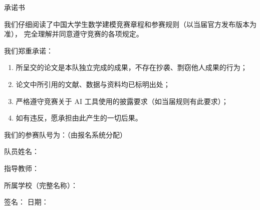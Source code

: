 \documentclass[12pt,a4paper]{ctexart}
\begin{document}
\thispagestyle{empty}

\begin{center}
    {\heiti 承\quad 诺\quad 书}
\end{center}
\vspace{1.5em}

我们仔细阅读了中国大学生数学建模竞赛章程和参赛规则（以当届官方发布版本为准），
完全理解并同意遵守竞赛的各项规定。

我们郑重承诺：
\begin{enumerate}
    \item 所呈交的论文是本队独立完成的成果，不存在抄袭、剽窃他人成果的行为；
    \item 论文中所引用的文献、数据与资料均已标明出处；
    \item 严格遵守竞赛关于 AI 工具使用的披露要求（如当届规则有此要求）；
    \item 如有违反，愿承担由此产生的一切后果。
\end{enumerate}

\vspace{2em}
\noindent 我们的参赛队号为：\underline{\hspace{6em}}（由报名系统分配）

\vspace{1em}
\noindent 队员姓名：\underline{\hspace{8em}}\quad
\underline{\hspace{8em}}\quad \underline{\hspace{8em}}

\vspace{1em}
\noindent 指导教师：\underline{\hspace{8em}}

\vspace{1em}
\noindent 所属学校（完整名称）：\underline{\hspace{24em}}

\vspace{1em}
\noindent 签名：\underline{\hspace{6em}}\quad
\underline{\hspace{6em}}\quad \underline{\hspace{6em}}\qquad 日期：\underline{\hspace{5em}}
\end{document}
